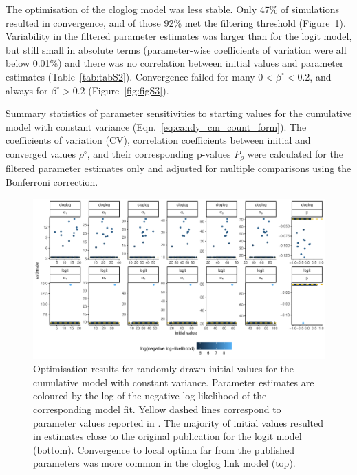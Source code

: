 The optimisation of the cloglog model was less stable. Only 47\% of simulations resulted in convergence, and of those 92\% met the filtering threshold (Figure~\ref{fig:figS1}). Variability in the filtered parameter estimates was larger than for the logit model, but still small in absolute terms (parameter-wise coefficients of variation were all below 0.01\%) and there was no correlation between initial values and parameter estimates (Table~\ref{tab:tabS2}). Convergence failed for many $0<\beta^{\circ}<0.2$, and always for $\beta^{\circ}>0.2$ (Figure~\ref{fig:figS3}). 


\begin{table}[bph]
  \small
    \centering
    \caption{Summary statistics of parameter sensitivities to starting values for the cumulative model with constant variance (Eqn.~\ref{eq:candy_cm_count_form}). The coefficients of variation (CV), correlation coefficients between initial and converged values $\rho^{\circ}$, and their corresponding p-values $P_\rho$ were calculated for the filtered parameter estimates only and adjusted for multiple comparisons using the Bonferroni correction.
    }
  
  \label{tab:tabS2}
\end{table}


\begin{figure}[htbp]
  \centering
  \includegraphics[width=\textwidth]{../figures/figS1_initial_value_sensitivity_unfiltered.pdf}
  \caption{Optimisation results for randomly drawn initial values for the cumulative model with constant variance. Parameter estimates are coloured by the log of the negative log-likelihood of the corresponding model fit. Yellow dashed lines correspond to parameter values reported in \citep{candy1991modeling}. The majority of initial values resulted in estimates close to the original publication for the logit model (bottom). Convergence to local optima far from the published parameters was more common in the cloglog link model (top).}
  \label{fig:figS1}
\end{figure} 

